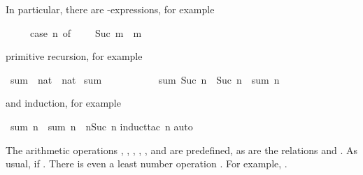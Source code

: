 %
\begin{isabellebody}%
\def\isabellecontext{natsum}%
%
\isadelimtheory
%
\endisadelimtheory
%
\isatagtheory
%
\endisatagtheory
{\isafoldtheory}%
%
\isadelimtheory
%
\endisadelimtheory
\isamarkuptrue%
%
\begin{isamarkuptext}%
\noindent
In particular, there are -expressions, for example
\begin{isabelle}%
\ \ \ \ \ case\ n\ of\ {}\ {\isasymRightarrow}\ {}\ {\isacharbar}\ Suc\ m\ {\isasymRightarrow}\ m%
\end{isabelle}
primitive recursion, for example%
\end{isamarkuptext}%
\isamarkupfalse%
\ sum\ {\isacharcolon}{\isacharcolon}\ {\isachardoublequote}nat\ {\isasymRightarrow}\ nat{\isachardoublequote}\isanewline
\isamarkupfalse%
\ {\isachardoublequote}sum\ {}\ {\isacharequal}\ {}{\isachardoublequote}\isanewline
\ \ \ \ \ \ \ \ {\isachardoublequote}sum\ {\isacharparenleft}Suc\ n{\isacharparenright}\ {\isacharequal}\ Suc\ n\ {\isacharplus}\ sum\ n{\isachardoublequote}\isamarkuptrue%
%
\begin{isamarkuptext}%
\noindent
and induction, for example%
\end{isamarkuptext}%
\isamarkupfalse%
\ {\isachardoublequote}sum\ n\ {\isacharplus}\ sum\ n\ {\isacharequal}\ n{\isacharasterisk}{\isacharparenleft}Suc\ n{\isacharparenright}{\isachardoublequote}\isanewline
%
\isadelimproof
%
\endisadelimproof
%
\isatagproof
\isamarkupfalse%
induct{\isacharunderscore}tac\ n{\isacharparenright}\isanewline
\isamarkupfalse%
auto{\isacharparenright}\isanewline
\isamarkupfalse%
%
\endisatagproof
{\isafoldproof}%
%
\isadelimproof
%
\endisadelimproof
\isamarkuptrue%
%
\begin{isamarkuptext}%
\newcommand{\mystar}{*%
}
%
The arithmetic operations ,
, \isadxboldpos{\mystar}{$HOL2arithfun},
, ,  and
 are predefined, as are the relations
 and
. As usual,  if
. There is even a least number operation
\@.  For example, .

\end{isamarkuptext}
\end{isabellebody}
